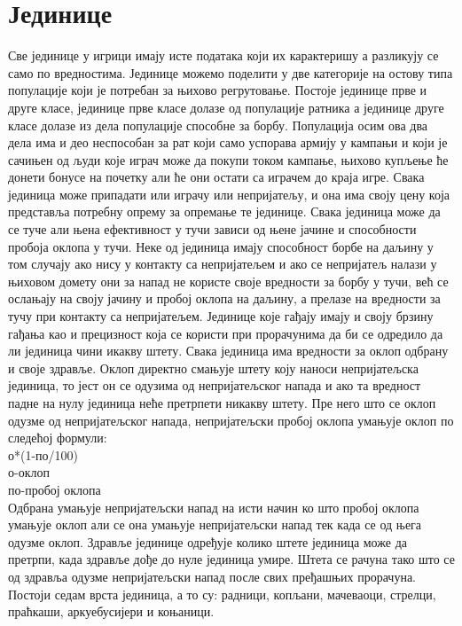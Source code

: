 \documentclass[11pt,a4paper]{report}
\begin{document}
\section{Јединице}
Све јединице у игрици имају исте података који их карактеришу а разликују се само по вредностима. Јединице можемо поделити у две категорије на остову типа популације који је потребан за њихово регрутовање. Постоје јединице прве и друге класе, јединице прве класе долазе од популације ратника а јединице друге класе долазе из дела популације способне за борбу. Популација осим ова два дела има и део неспособан за рат који само успорава армију у кампањи и који је сачињен од људи које играч може да покупи током кампање, њихово купљење ће донети бонусе на почетку али ће они остати са играчем до краја игре. Свака јединица може припадати или играчу или непријатељу, и она има своју цену која представља потребну опрему за опремање те јединице. Свака јединица може да се туче али њена ефективност у тучи зависи од њене јачине и способности пробоја оклопа у тучи. Неке од јединица имају способност борбе на даљину у том случају ако нису у контакту са непријатељем и ако се непријатељ налази у њиховом домету они за напад не користе своје вредности за борбу у тучи, већ се ослањају на своју јачину и пробој оклопа на даљину, а прелазе на вредности за тучу при контакту са непријатељем. Јединице које гађају имају и своју брзину гађања као и прецизност која се користи при прорачунима да би се одредило да ли јединица чини икакву штету. Свака јединица има вредности за оклоп одбрану и своје здравље. Оклоп директно смањује штету коју наноси непријатељска јединица, то јест он се одузима од непријатељског напада и ако та вредност падне на нулу јединица неће претрпети никакву штету. Пре него што се оклоп одузме од непријатељског напада, непријатељски пробој оклопа умањује оклоп по следећој формули:
\\ о*(1-по/100)
\\ о-оклоп 
\\ по-пробој оклопа
\\ Одбрана умањује непријатељски напад на исти начин ко што пробој оклопа умањује оклоп али се она умањује непријатељски напад тек када се од њега одузме оклоп. Здравље јединице одређује колико штете јединица може да претрпи, када здравље дође до нуле јединица умире. Штета се рачуна тако што се од здравља одузме непријатељски напад после свих пређашњих прорачуна. Постоји седам врста јединица, а то су: радници, копљани, мачеваоци, стрелци, праћкаши, аркуебусијери и коњаници.
\end{document}
